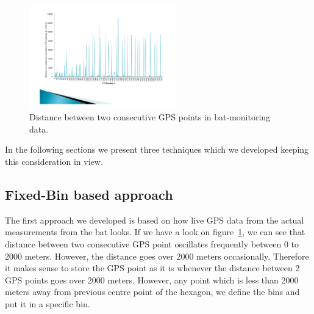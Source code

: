 \documentclass[conference]{IEEEtran}
\begin{document}
\begin{figure}[ht]
  \centering
  \includegraphics[width=2.5in]{images/distance-based.pdf}
  \caption {Distance between two consecutive GPS points in bat-monitoring data.}
  \label{fig:distance-bat-monitoring}
\end{figure}
In the following sections we present three techniques which we developed keeping this consideration in view.

\subsection{Fixed-Bin based approach}\label{sec:fixed-bin}
The first approach we developed is based on how live GPS data from the actual measurements from the bat looks. If we have a look on figure~\ref{fig:distance-bat-monitoring}, we can see that distance between two consecutive GPS point oscillates frequently between 0 to 2000 meters. However, the distance goes over 2000 meters occasionally. Therefore it makes sense to store the GPS point as it is whenever the distance between 2 GPS points goes over 2000 meters. However, any point which is less than 2000 meters away from previous centre point of the hexagon, we define the bins and put it in a specific bin.
\end{document}
